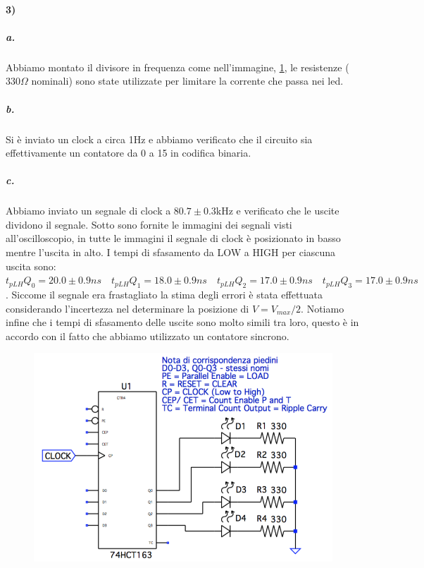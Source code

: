 \documentclass{article}
\begin{document}
\paragraph{3)}
	\subparagraph{a.} Abbiamo montato il divisore in frequenza come nell'immagine, \ref{fig:div_freq1}, le resistenze ($330\Omega$ nominali) sono state utilizzate per limitare la corrente che passa nei led.
	\subparagraph{b.} Si è inviato un clock a circa 1Hz e abbiamo verificato che il circuito sia effettivamente un contatore da 0 a 15 in codifica binaria.
	\subparagraph{c.} Abbiamo inviato un segnale di clock a $80.7\pm0.3$kHz e verificato che le uscite dividono il segnale. Sotto sono fornite le immagini dei segnali visti all'oscilloscopio, in tutte le immagini il segnale di clock è posizionato in basso mentre l'uscita in alto.\newline
	I tempi di sfasamento da LOW a HIGH per ciascuna uscita sono: $t_{pLH} Q_0=20.0\pm0.9ns \quad t_{pLH} Q_1=18.0\pm0.9ns \quad t_{pLH} Q_2=17.0\pm0.9ns \quad t_{pLH} Q_3=17.0\pm0.9ns$. Siccome il segnale era frastagliato la stima degli errori è stata effettuata considerando l'incertezza nel determinare la posizione di $V=V_{max}/2$. Notiamo infine che i tempi di sfasamento delle uscite sono molto simili tra loro, questo è in accordo con il fatto che abbiamo utilizzato un contatore sincrono.
	
	\begin{figure}
	\begin{center}
		\includegraphics[width=0.7\linewidth]{immagini/div_freq1}
		\label{fig:div_freq1}
	\end{center}
	\end{figure}
\end{document}
